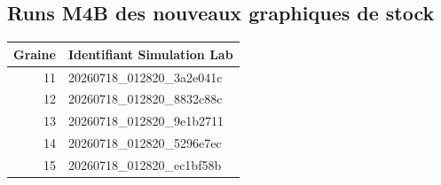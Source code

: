 \subsection{Runs M4B des nouveaux graphiques de stock}
\begin{longtable}{@{}rl@{}}\toprule Graine & Identifiant Simulation Lab \\\midrule\endhead
11 & 20260718\_\allowbreak{}012820\_\allowbreak{}3a2e041c \\
12 & 20260718\_\allowbreak{}012820\_\allowbreak{}8832c88c \\
13 & 20260718\_\allowbreak{}012820\_\allowbreak{}9e1b2711 \\
14 & 20260718\_\allowbreak{}012820\_\allowbreak{}5296e7ec \\
15 & 20260718\_\allowbreak{}012820\_\allowbreak{}ec1bf58b \\
\bottomrule\end{longtable}
